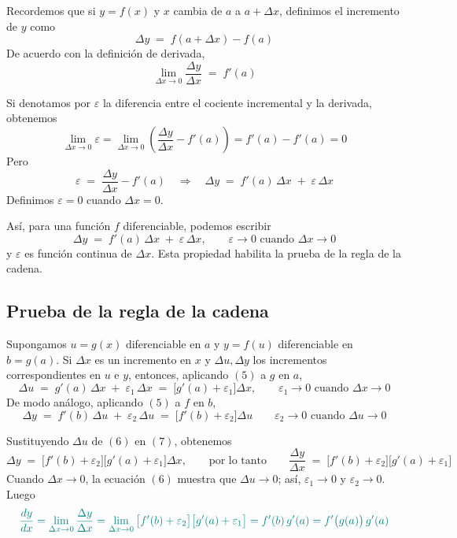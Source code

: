 \documentclass{article}
\begin{document}
Recordemos que si \(y=f(x)\) y \(x\) cambia de \(a\) a \(a+\Delta x\), definimos el incremento de \(y\) como
\[
\Delta y \;=\; f(a+\Delta x)-f(a)
\]
De acuerdo con la definición de derivada,
\[
\lim_{\Delta x\to 0}\frac{\Delta y}{\Delta x} \;=\; f'(a)
\]

Si denotamos por \(\varepsilon\) la diferencia entre el cociente incremental y la derivada, obtenemos
\[
\lim_{\Delta x\to 0}\varepsilon
=\lim_{\Delta x\to 0}\!\left(\frac{\Delta y}{\Delta x}-f'(a)\right)
= f'(a)-f'(a)=0
\]
Pero
\[
\varepsilon \;=\; \frac{\Delta y}{\Delta x}-f'(a)
\quad\Longrightarrow\quad
\Delta y \;=\; f'(a)\,\Delta x \;+\; \varepsilon\,\Delta x
\]
Definimos \(\varepsilon=0\) cuando \(\Delta x=0\).

\medskip
\noindent
Así, para una función \(f\) diferenciable, podemos escribir
\begin{equation}
\Delta y \;=\; f'(a)\,\Delta x \;+\; \varepsilon\,\Delta x,
\qquad
\varepsilon\to 0 \text{ cuando } \Delta x\to 0
\tag{5}
\end{equation}
y \(\varepsilon\) es función continua de \(\Delta x\). Esta propiedad habilita la prueba de la regla de la cadena.

\subsection*{Prueba de la regla de la cadena}
Supongamos \(u=g(x)\) diferenciable en \(a\) y \(y=f(u)\) diferenciable en \(b=g(a)\).
Si \(\Delta x\) es un incremento en \(x\) y \(\Delta u, \Delta y\) los incrementos correspondientes en \(u\) e \(y\),
entonces, aplicando \((5)\) a \(g\) en \(a\),
\begin{equation}
\Delta u \;=\; g'(a)\,\Delta x \;+\; \varepsilon_1\,\Delta x
\;=\; \big[g'(a)+\varepsilon_1\big]\Delta x,
\qquad
\varepsilon_1\to 0 \text{ cuando } \Delta x\to 0
\tag{6}
\end{equation}
De modo análogo, aplicando \((5)\) a \(f\) en \(b\),
\begin{equation}
\Delta y \;=\; f'(b)\,\Delta u \;+\; \varepsilon_2\,\Delta u
\;=\; \big[f'(b)+\varepsilon_2\big]\Delta u
\qquad
\varepsilon_2\to 0 \text{ cuando } \Delta u\to 0
\tag{7}
\end{equation}

Sustituyendo \(\Delta u\) de \((6)\) en \((7)\), obtenemos
\[
\Delta y \;=\; \big[f'(b)+\varepsilon_2\big]\big[g'(a)+\varepsilon_1\big]\Delta x,
\qquad\text{por lo tanto}\qquad
\frac{\Delta y}{\Delta x} \;=\; \big[f'(b)+\varepsilon_2\big]\big[g'(a)+\varepsilon_1\big]
\]
Cuando \(\Delta x\to 0\), la ecuación \((6)\) muestra que \(\Delta u\to 0\); así, \(\varepsilon_1\to 0\) y \(\varepsilon_2\to 0\).
Luego
\[ \color{teal}
\frac{dy}{dx}
=\lim_{\Delta x\to 0}\frac{\Delta y}{\Delta x}
=\lim_{\Delta x\to 0}\big[f'(b)+\varepsilon_2\big]\big[g'(a)+\varepsilon_1\big]
=f'(b)\,g'(a)
=f'\big(g(a)\big)\,g'(a)
\]
\end{document}
